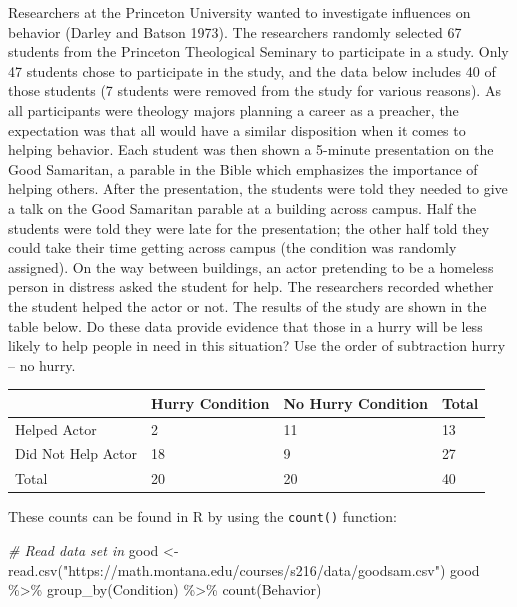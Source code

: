 \documentclass[
]{report}
\newenvironment{Shaded}{\begin{snugshade}}{\end{snugshade}}
\newcommand{\CommentTok}[1]{\textcolor[rgb]{0.56,0.35,0.01}{\textit{#1}}}
\newcommand{\FunctionTok}[1]{\textcolor[rgb]{0.00,0.00,0.00}{#1}}
\newcommand{\NormalTok}[1]{#1}
\newcommand{\OtherTok}[1]{\textcolor[rgb]{0.56,0.35,0.01}{#1}}
\newcommand{\SpecialCharTok}[1]{\textcolor[rgb]{0.00,0.00,0.00}{#1}}
\newcommand{\StringTok}[1]{\textcolor[rgb]{0.31,0.60,0.02}{#1}}
\begin{document}
Researchers at the Princeton University wanted to investigate influences on behavior (Darley and Batson 1973). The researchers randomly selected 67 students from the Princeton Theological Seminary to participate in a study. Only 47 students chose to participate in the study, and the data below includes 40 of those students (7 students were removed from the study for various reasons). As all participants were theology majors planning a career as a preacher, the expectation was that all would have a similar disposition when it comes to helping behavior. Each student was then shown a 5-minute presentation on the Good Samaritan, a parable in the Bible which emphasizes the importance of helping others. After the presentation, the students were told they needed to give a talk on the Good Samaritan parable at a building across campus. Half the students were told they were late for the presentation; the other half told they could take their time getting across campus (the condition was randomly assigned). On the way between buildings, an actor pretending to be a homeless person in distress asked the student for help. The researchers recorded whether the student helped the actor or not. The results of the study are shown in the table below. Do these data provide evidence that those in a hurry will be less likely to help people in need in this situation? Use the order of subtraction hurry -- no hurry.

\begin{longtable}[]{@{}llll@{}}
\toprule()
& Hurry Condition & No Hurry Condition & Total \\
\midrule()
\endhead
Helped Actor & 2 & 11 & 13 \\
Did Not Help Actor & 18 & 9 & 27 \\
Total & 20 & 20 & 40 \\
\bottomrule()
\end{longtable}

\newpage

These counts can be found in R by using the \texttt{count()} function:

\begin{Shaded}
\begin{Highlighting}[]
\CommentTok{\# Read data set in}
\NormalTok{good }\OtherTok{\textless{}{-}} \FunctionTok{read.csv}\NormalTok{(}\StringTok{"https://math.montana.edu/courses/s216/data/goodsam.csv"}\NormalTok{) }
\NormalTok{good }\SpecialCharTok{\%\textgreater{}\%} \FunctionTok{group\_by}\NormalTok{(Condition) }\SpecialCharTok{\%\textgreater{}\%} \FunctionTok{count}\NormalTok{(Behavior)}
\end{Highlighting}
\end{Shaded}
\end{document}
